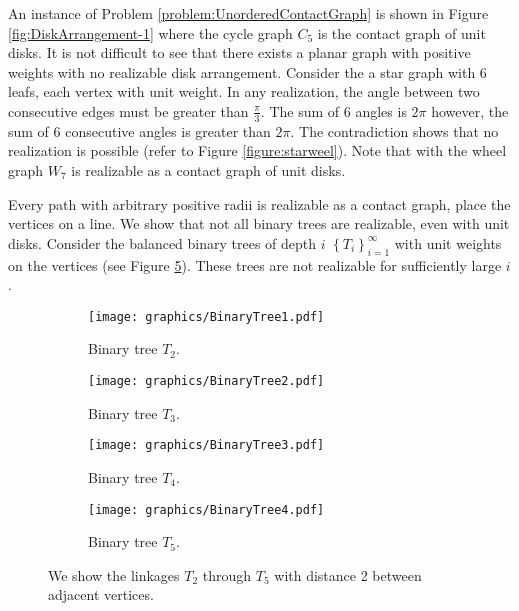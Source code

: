 An instance of Problem \ref{problem:UnorderedContactGraph} is shown in Figure \ref{fig:DiskArrangement-1} where the cycle graph $C_5$ is the contact graph of unit disks.
It is not difficult to see that there exists a planar graph with positive weights with no realizable disk arrangement.
Consider the a star graph with 6 leafs, each vertex with unit weight.
In any realization, the angle between two consecutive edges must be greater than $\frac{\pi}{3}$. 
The sum of 6 angles is $2 \pi$ however, the sum of 6 consecutive angles is greater than $2\pi$.
The contradiction shows that no realization is possible (refer to Figure \ref{figure:starweel}).
Note that with the wheel graph $W_7$ is realizable as a contact graph of unit disks.

Every path with arbitrary positive radii is realizable as a contact graph, place the vertices on a line.
We show that not all binary trees are realizable, even with unit disks.%
Consider the balanced binary trees of depth $i$ $\left\lbrace T_i \right\rbrace_{i=1}^\infty$ with unit weights on the vertices (see Figure \ref{fig:circlePacking-1}).
These trees are not realizable for sufficiently large $i$.
\begin{figure}[!htbp]
\begin{center}
  \begin{subfigure}[b]{0.21\textwidth}
	  \texttt{[image: graphics/BinaryTree1.pdf]}
	  \caption{Binary tree $T_2$.}
	  \label{fig:circlePacking1-1}
  \end{subfigure}
  \begin{subfigure}[b]{0.21\textwidth}
	  \texttt{[image: graphics/BinaryTree2.pdf]}
	  \caption{Binary tree $T_3$.}
	  \label{fig:circlePacking1-2}
  \end{subfigure}
  \begin{subfigure}[b]{0.21\textwidth}
	  \texttt{[image: graphics/BinaryTree3.pdf]}
	  \caption{Binary tree $T_4$.}
	  \label{fig:circlePacking1-3}
  \end{subfigure}
  \begin{subfigure}[b]{0.21\textwidth}
	  \texttt{[image: graphics/BinaryTree4.pdf]}
	  \caption{Binary tree $T_5$.}
	  \label{fig:circlePacking1-4}
  \end{subfigure}
  \caption{ We show the linkages $T_2$ through $T_5$ with distance 2 between adjacent vertices.  }\label{fig:circlePacking-1}
\end{center} 
\end{figure}
